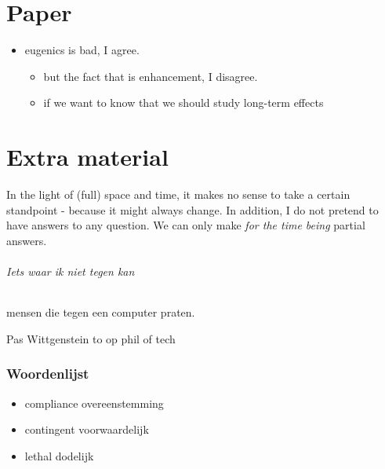 \documentclass[../main/main.tex]{subfiles}
\begin{document}
\newpage
\part{Paper}
\begin{itemize}
\item eugenics is bad, I agree.
\begin{itemize}
\item but the fact that is enhancement, I disagree.	
\item if we want to know that we should study long-term effects
\end{itemize}
\end{itemize}

\newpage
\part{Extra material}
In the light of (full) space and time, it makes no sense to take a certain standpoint - because it might always change. In addition, I do not pretend to have answers to any question. We can only make \textit{for the time being} partial answers. 

\paragraph{Iets waar ik niet tegen kan} mensen die tegen een computer praten.

Pas Wittgenstein to op phil of tech

\newpage
\section{Woordenlijst}
\begin{itemize}
\item compliance \hfill overeenstemming
\item contingent \hfill voorwaardelijk
\item lethal	\hfill dodelijk
\end{itemize}
\end{document}
